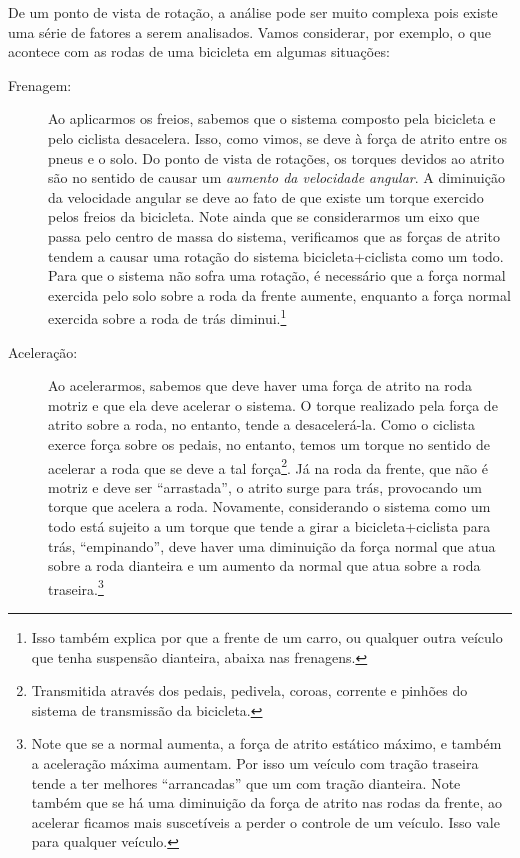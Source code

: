 De um ponto de vista de rotação, a análise pode ser muito complexa pois existe uma série de fatores a serem analisados. Vamos considerar, por exemplo, o que acontece com as rodas de uma bicicleta em algumas situações:
\begin{description}
    \item[Frenagem:] Ao aplicarmos os freios, sabemos que o sistema composto pela bicicleta e pelo ciclista desacelera. Isso, como vimos, se deve à força de atrito entre os pneus e o solo. Do ponto de vista de rotações, os torques devidos ao atrito são no sentido de causar um \emph{aumento da velocidade angular}. A diminuição da velocidade angular se deve ao fato de que existe um torque exercido pelos freios da bicicleta. Note ainda que se considerarmos um eixo que passa pelo centro de massa do sistema, verificamos que as forças de atrito tendem a causar uma rotação do sistema bicicleta+ciclista como um todo. Para que o sistema não sofra uma rotação, é necessário que a força normal exercida pelo solo sobre a roda da frente aumente, enquanto a força normal exercida sobre a roda de trás diminui.\footnote{Isso também explica por que a frente de um carro, ou qualquer outra veículo que tenha suspensão dianteira, abaixa nas frenagens.}
    \item[Aceleração:] Ao acelerarmos, sabemos que deve haver uma força de atrito na roda motriz e que ela deve acelerar o sistema. O torque realizado pela força de atrito sobre a roda, no entanto, tende a desacelerá-la. Como o ciclista exerce força sobre os pedais, no entanto, temos um torque no sentido de acelerar a roda que se deve a tal força\footnote{Transmitida através dos pedais, pedivela, coroas, corrente e pinhões do sistema de transmissão da bicicleta.}. Já na roda da frente, que não é motriz e deve ser ``arrastada'', o atrito surge para trás, provocando um torque que acelera a roda. Novamente, considerando o sistema como um todo está sujeito a um torque que tende a girar a bicicleta+ciclista para trás, ``empinando'', deve haver uma diminuição da força normal que atua sobre a roda dianteira e um aumento da normal que atua sobre a roda traseira.\footnote{Note que se a normal aumenta, a força de atrito estático máximo, e também a aceleração máxima aumentam. Por isso um veículo com tração traseira tende a ter melhores ``arrancadas'' que um com tração dianteira. Note também que se há uma diminuição da força de atrito nas rodas da frente, ao acelerar ficamos mais suscetíveis a perder o controle de um veículo. Isso vale para qualquer veículo.}

\end{description}
